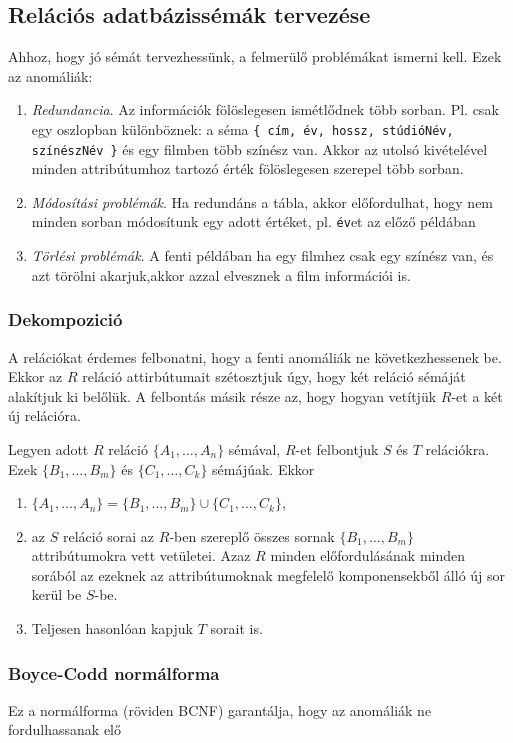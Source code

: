 \documentclass[fleqn,10pt,a4paper]{article}
\newcommand{\listazjbetu}{
  \renewcommand{\theenumi}{\alph{enumi}}
  \renewcommand{\labelenumi}{(\theenumi)}
}
\newenvironment{enumzjbetu}{\listazjbetu\begin{enumerate}}{\end{enumerate}}
\newenvironment{enumzjb}{\begin{enumzjbetu}}{\end{enumzjbetu}}
\theoremstyle{magyar}
\begin{document}
  \subsection{Relációs adatbázissémák tervezése}
  Ahhoz, hogy jó sémát tervezhessünk, a felmerülő problémákat ismerni kell. Ezek az anomáliák:

  \begin {enumerate}
  \item \emph{Redundancia}.  Az információk fölöslegesen ismétlődnek több sorban. Pl. csak egy oszlopban különböznek: a
    séma \texttt{\{ cím, év, hossz, stúdióNév, színészNév \}} és egy filmben több színész van. Akkor az utolsó
    kivételével minden attribútumhoz tartozó érték fölöslegesen szerepel több sorban.
  \item \emph{Módosítási problémák}. Ha redundáns a tábla, akkor előfordulhat, hogy nem minden sorban módosítunk egy
    adott értéket, pl. \texttt{év}et az előző példában
  \item \emph{Törlési problémák}. A fenti példában ha egy filmhez csak egy színész van, és azt törölni akarjuk,akkor
    azzal elvesznek a film információi is.  
  \end{enumerate}

  \subsubsection{Dekompozició}
  A relációkat érdemes felbonatni, hogy a fenti anomáliák ne következhessenek be. Ekkor az $R$ reláció attirbútumait
  szétosztjuk úgy, hogy két reláció sémáját alakítjuk ki belőlük. A felbontás másik része az, hogy hogyan vetítjük
  $R$-et a két új relációra.
  
  Legyen adott $R$ reláció $\{A_1,\ldots,A_n\}$ sémával, $R$-et felbontjuk $S$ és $T$ relációkra. Ezek $\{B_1,\ldots,B_m\}$ és
  $\{C_1,\ldots,C_k\}$ sémájúak. Ekkor 
  \begin{enumzjb}
  \item $\{A_1,\ldots,A_n\} = \{B_1,\ldots,B_m\} \cup \{C_1,\ldots,C_k\}$,
  \item az $S$ reláció sorai az $R$-ben szereplő összes sornak $\{B_1,\ldots,B_m\}$ attribútumokra vett vetületei. Azaz
    $R$ minden előfordulásának minden sorából az ezeknek az attribútumoknak megfelelő komponensekből álló új sor kerül
    be $S$-be.
  \item Teljesen hasonlóan kapjuk $T$ sorait is.
  \end{enumzjb}
  
  \subsubsection{Boyce-Codd normálforma} Ez a normálforma (röviden BCNF) garantálja, hogy az anomáliák ne fordulhassanak
  elő
  
\end{document}
